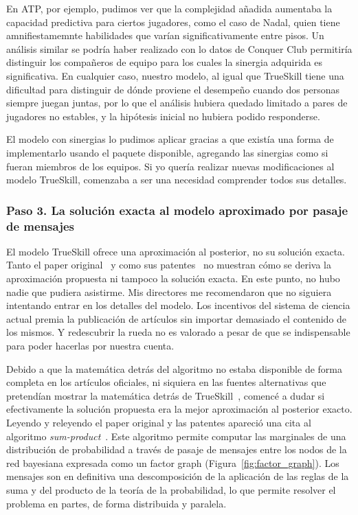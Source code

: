 \documentclass[a4paper,11pt]{book}
\theoremstyle{definition}
\begin{document}

En ATP, por ejemplo, pudimos ver que la complejidad a\~nadida aumentaba la capacidad predictiva para ciertos jugadores, como el caso de Nadal, quien tiene amnifiestamemnte habilidades que var\'ian significativamente entre pisos.
%
Un an\'alisis similar se podr\'ia haber realizado con lo datos de Conquer Club permitir\'ia distinguir los compa\~neros de equipo para los cuales la sinergia adquirida es significativa.
%
En cualquier caso, nuestro modelo, al igual que TrueSkill tiene una dificultad para distinguir de d\'onde proviene el desempe\~no cuando dos personas siempre juegan juntas, por lo que el an\'alisis hubiera quedado limitado a pares de jugadores no estables, y la hip\'otesis inicial no hubiera podido responderse.


El modelo con sinergias lo pudimos aplicar gracias a que exist\'ia una forma de implementarlo usando el paquete disponible, agregando las sinergias como si fueran miembros de los equipos.
%
Si yo quer\'ia realizar nuevas modificaciones al modelo TrueSkill, comenzaba a ser una necesidad comprender todos sus detalles.

\subsubsection{Paso 3. La soluci\'on exacta al modelo aproximado por pasaje de mensajes}

El modelo TrueSkill ofrece una aproximaci\'on al posterior, no su soluci\'on exacta.
%
Tanto el paper original~\cite{Herbrich2007} y como sus patentes~\cite{trueskill_patent_06, trueskill_patent_09} no muestran c\'omo se deriva la aproximaci\'on propuesta ni tampoco la soluci\'on exacta.
%
En este punto, no hubo nadie que pudiera asistirme.
%
Mis directores me recomendaron que no siguiera intentando entrar en los detalles del modelo.
%
Los incentivos del sistema de ciencia actual premia la publicaci\'on de art\'iculos sin importar demasiado el contenido de los mismos.
%
Y redescubrir la rueda no es valorado a pesar de que se indispensable para poder hacerlas por nuestra cuenta.


Debido a que la matem\'atica detr\'as del algoritmo no estaba disponible de forma completa en los art\'iculos oficiales, ni siquiera en las fuentes alternativas que pretend\'ian mostrar la matem\'atica detr\'as de TrueSkill~\cite{Mosser2011}, comenc\'e a dudar si efectivamente la soluci\'on propuesta era la mejor aproximaci\'on al posterior exacto.
%
Leyendo y releyendo el paper original y las patentes apareci\'o una cita al algoritmo \emph{sum-product}~\cite{Kschischang2001}.
%
Este algoritmo permite computar las marginales de una distribuci\'on de probabilidad a trav\'es de pasaje de mensajes entre los nodos de la red bayesiana expresada como un factor graph (Figura~\ref{fig:factor_graph}).
%
Los mensajes son en definitiva una descomposici\'on de la aplicaci\'on de las reglas de la suma y del producto de la teor\'ia de la probabilidad, lo que permite resolver el problema en partes, de forma distribuida y paralela.
\end{document}
